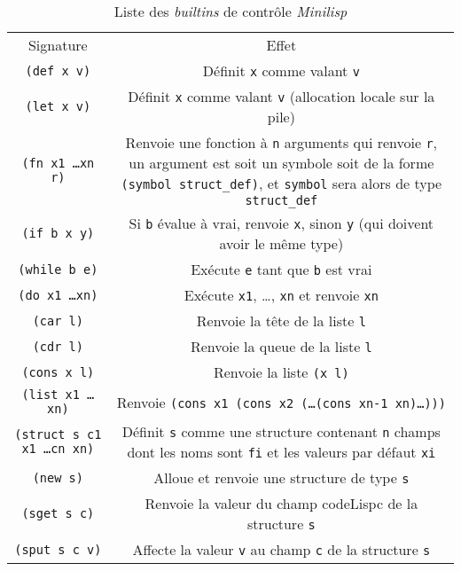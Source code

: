 \documentclass[a4paper, 10pt, french]{article}
\newcommand{\codeLisp}[1]{\texttt{#1}}
\newcommand{\code}[1]{\texttt{#1}}
\newcommand{\foreign}[1]{\emph{#1}}
\begin{document}
\begin{table}[H]
  \centering
  \begin{tabularx}{\linewidth}{|C|C|}
    \hline
    Signature & Effet \tabularnewline
    \hhline{|=|=|}
    \codeLisp{(def x v)} & Définit \codeLisp{x} comme valant \codeLisp{v} \tabularnewline
    \hline
    \codeLisp{(let x v)} & Définit \codeLisp{x} comme valant \codeLisp{v} (allocation locale sur la pile) \tabularnewline
    \hline
    \codeLisp{(fn x1 \ldots xn r)} & Renvoie une fonction à \code{n} arguments qui renvoie \codeLisp{r}, un argument est soit un symbole soit de la forme \codeLisp{(symbol struct_def)}, et \codeLisp{symbol} sera alors de type \codeLisp{struct_def} \tabularnewline
    \hhline{|=|=|}
    \codeLisp{(if b x y)} & Si \codeLisp{b} évalue à vrai, renvoie \codeLisp{x}, sinon \codeLisp{y} (qui doivent avoir le même type) \tabularnewline
    \hline
    \codeLisp{(while b e)} & Exécute \codeLisp{e} tant que \codeLisp{b} est vrai \tabularnewline
    \hline
    \codeLisp{(do x1 \ldots xn)} & Exécute \codeLisp{x1}, \ldots, \codeLisp{xn} et renvoie \codeLisp{xn} \tabularnewline
    \hhline{|=|=|}
    \codeLisp{(car l)} & Renvoie la tête de la liste \codeLisp{l} \tabularnewline
    \hline
    \codeLisp{(cdr l)} & Renvoie la queue de la liste \codeLisp{l} \tabularnewline
    \hline
    \codeLisp{(cons x l)} & Renvoie la liste \codeLisp{(x l)} \tabularnewline
    \hline
    \codeLisp{(list x1 \ldots xn)} & Renvoie \codeLisp{(cons x1 (cons x2 (\ldots (cons xn-1 xn)\ldots)))} \tabularnewline
    \hhline{|=|=|}
    \codeLisp{(struct s c1 x1 \ldots cn xn)} & Définit \codeLisp{s} comme une structure contenant \code{n} champs dont les noms sont \codeLisp{fi} et les valeurs par défaut \codeLisp{xi} \tabularnewline
    \hline
    \codeLisp{(new s)} & Alloue et renvoie une structure de type \codeLisp{s} \tabularnewline
    \hline
    \codeLisp{(sget s c)} & Renvoie la valeur du champ codeLisp{c} de la structure \codeLisp{s} \tabularnewline
    \hline
    \codeLisp{(sput s c v)} & Affecte la valeur \codeLisp{v} au champ \codeLisp{c} de la structure \codeLisp{s} \tabularnewline
    \hline
  \end{tabularx}
  \caption{Liste des \foreign{builtins} de contrôle \foreign{Minilisp}}
\end{table}
\end{document}
